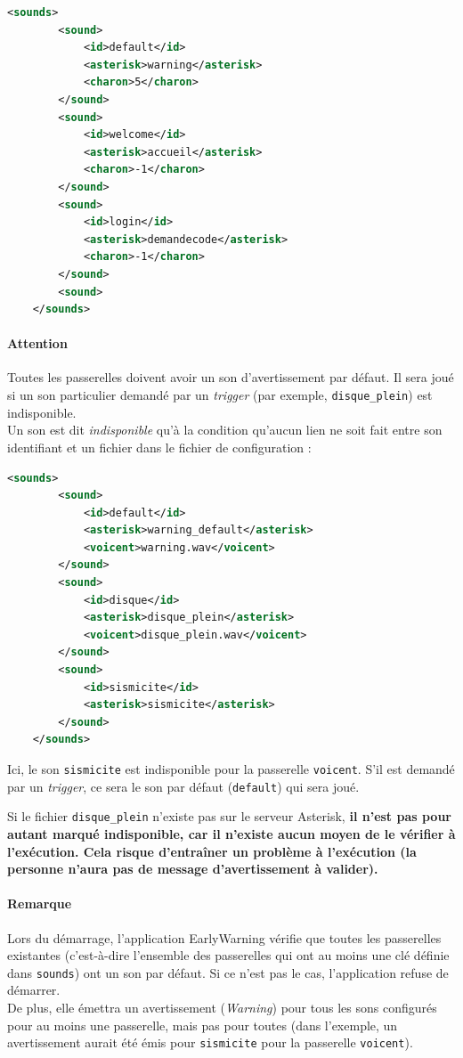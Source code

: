 \documentclass{article}
\begin{document}
\lstset{
    language=xml
}
\begin{lstlisting}[language=xml,name=Aperçu de la section sounds]
    <sounds>
        <sound>
            <id>default</id>
            <asterisk>warning</asterisk>
            <charon>5</charon>
        </sound>
        <sound>
            <id>welcome</id>
            <asterisk>accueil</asterisk>
            <charon>-1</charon>
        </sound>
        <sound>
            <id>login</id>
            <asterisk>demandecode</asterisk>
            <charon>-1</charon>
        </sound>
        <sound>
    </sounds>
\end{lstlisting}

\paragraph{Attention} Toutes les passerelles doivent avoir un son d'avertissement par défaut. Il sera joué si un son particulier demandé par un \emph{trigger} (par exemple, \texttt{disque\_plein}) est indisponible.\\
Un son est dit \emph{indisponible} qu'à la condition qu'aucun lien ne soit fait entre son identifiant et un fichier dans le fichier de configuration :

\begin{lstlisting}[language=xml,name=Exemple de configuration avec son indisponible]
    <sounds>
        <sound>
            <id>default</id>
            <asterisk>warning_default</asterisk>
            <voicent>warning.wav</voicent>
        </sound>
        <sound>
            <id>disque</id>
            <asterisk>disque_plein</asterisk>
            <voicent>disque_plein.wav</voicent>
        </sound>
        <sound>
            <id>sismicite</id>
            <asterisk>sismicite</asterisk>
        </sound>
    </sounds>
\end{lstlisting}

Ici, le son \texttt{sismicite} est indisponible pour la passerelle \texttt{voicent}. S'il est demandé par un \emph{trigger}, ce sera le son par défaut (\texttt{default}) qui sera joué.

Si le fichier \texttt{disque\_plein} n'existe pas sur le serveur Asterisk, \textbf{il n'est pas pour autant marqué indisponible, car il n'existe aucun moyen de le vérifier à l'exécution. Cela risque d'entraîner un problème à l'exécution (la personne n'aura pas de message d'avertissement à valider).}

\paragraph{Remarque} Lors du démarrage, l'application EarlyWarning vérifie que toutes les passerelles existantes (c'est-à-dire l'ensemble des passerelles qui ont au moins une clé définie dans \texttt{sounds}) ont un son par défaut. Si ce n'est pas le cas, l'application refuse de démarrer.\\
De plus, elle émettra un avertissement (\emph{Warning}) pour tous les sons configurés pour au moins une passerelle, mais pas pour toutes (dans l'exemple, un avertissement aurait été émis pour \texttt{sismicite} pour la passerelle \texttt{voicent}).
\end{document}
